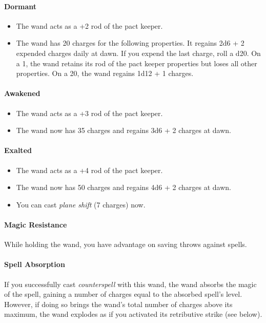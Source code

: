 \documentclass[letter,10pt,twocolumn,openany]{dndbook}
\begin{document}

\paragraph{Dormant}
\begin{itemize}
    \item The wand acts as a +2 rod of the pact keeper.
    \item The wand has 20 charges for the following properties.
        It regains 2d6 + 2 expended charges daily at dawn.
        If you expend the last charge, roll a d20.
        On a 1, the wand retains its rod of the pact keeper properties but loses all other properties.
        On a 20, the wand regains 1d12 + 1 charges.
\end{itemize}

\paragraph{Awakened}
\begin{itemize}
    \item The wand acts as a +3 rod of the pact keeper.
    \item The wand now has 35 charges and regains 3d6 + 2 charges at dawn.
\end{itemize}

\paragraph{Exalted}
\begin{itemize}
    \item The wand acts as a +4 rod of the pact keeper.
    \item The wand now has 50 charges and regains 4d6 + 2 charges at dawn.
    \item You can cast \textit{plane shift} (7 charges) now.
\end{itemize}

\paragraph{Magic Resistance}
    While holding the wand, you have advantage on saving throws against spells.

\paragraph{Spell Absorption}
    If you successfully cast \textit{counterspell} with this wand, the wand absorbs the magic of the spell, gaining a number of charges equal to the absorbed spell's level.
    However, if doing so brings the wand's total number of charges above its maximum, the wand explodes as if you activated its retributive strike (see below).
\end{document}
